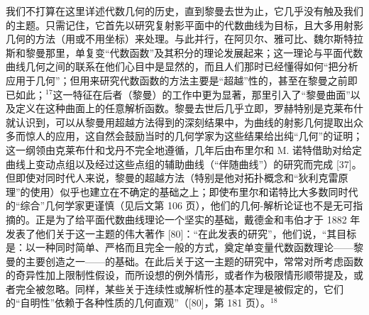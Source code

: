我们不打算在这里详述代数几何的历史，直到黎曼去世为止，它几乎没有触及我们的主题。只需记住，它首先以研究复射影平面中的代数曲线为目标，且大多用射影几何的方法（用或不用坐标）来处理。与此并行，在阿贝尔、雅可比、魏尔斯特拉斯和黎曼那里，单复变“代数函数”及其积分的理论发展起来；这一理论与平面代数曲线几何之间的联系在他们心目中是显然的，而且人们那时已经懂得如何“把分析应用于几何”；但用来研究代数函数的方法主要是“超越”性的，甚至在黎曼之前即已如此；\(^{17}\)这一特征在后者（黎曼）的工作中更为显著，那里引入了“黎曼曲面”以及定义在这种曲面上的任意解析函数。黎曼去世后几乎立即，罗赫特别是克莱布什就认识到，可以从黎曼用超越方法得到的深刻结果中，为曲线的射影几何提取出众多而惊人的应用，这自然会鼓励当时的几何学家为这些结果给出纯“几何”的证明；这一纲领由克莱布什和戈丹不完全地遵循，几年后由布里尔和 M. 诺特借助对给定曲线上变动点组以及经过这些点组的辅助曲线（“伴随曲线”）的研究而完成 {[}37{]}。但即使对同时代人来说，黎曼的超越方法（特别是他对拓扑概念和“狄利克雷原理”的使用）似乎也建立在不确定的基础之上；即使布里尔和诺特比大多数同时代的“综合”几何学家更谨慎（见后文第 106 页），他们的几何-解析论证也不是无可指摘的。正是为了给平面代数曲线理论一个坚实的基础，戴德金和韦伯才于 1882 年发表了他们关于这一主题的伟大著作 {[}80{]}：“在此发表的研究”，他们说，“其目标是：以一种同时简单、严格而且完全一般的方式，奠定单变量代数函数理论——黎曼的主要创造之一——的基础。在此后关于这一主题的研究中，常常对所考虑函数的奇异性加上限制性假设，而所设想的例外情形，或者作为极限情形顺带提及，或者完全被忽略。同样，某些关于连续性或解析性的基本定理是被假定的，它们的“自明性”依赖于各种性质的几何直观”（{[}80{]}，第 181 页）。\(^{18}\)

